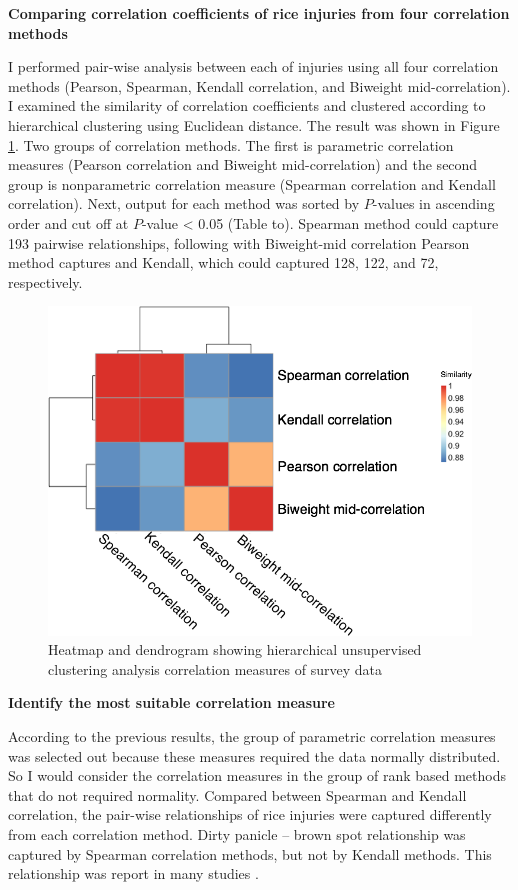 \textbf{Comparing correlation coefficients of rice injuries from four correlation methods }

I performed pair-wise analysis between each of injuries using all four correlation methods (Pearson, Spearman, Kendall correlation, and Biweight mid-correlation). I examined the similarity of correlation coefficients and clustered according to hierarchical clustering using Euclidean distance. The result was shown in Figure \ref{fig:heatmap}. Two groups of correlation methods. The first is parametric correlation measures (Pearson correlation and Biweight mid-correlation) and the second group is nonparametric correlation measure (Spearman correlation and Kendall correlation). Next, output for each method was sorted by $P$-values in ascending order and cut off at $P$-value < 0.05 (Table to).  Spearman method could capture 193 pairwise relationships, following with Biweight-mid correlation Pearson method captures and Kendall, which could captured 128, 122, and 72, respectively.

\begin{figure}[!h]
\centering
\includegraphics[width = 1\textwidth]{figures/heatmap/heatmap.png}
\caption{Heatmap and dendrogram showing hierarchical unsupervised clustering analysis correlation measures of survey data}
\label{fig:heatmap}
\end{figure}

\textbf{Identify the most suitable correlation measure}

According to the previous results, the group of parametric correlation measures was selected out because these measures required the data normally distributed. So I would consider the correlation measures in the group of rank based methods that do not required normality. Compared between Spearman and Kendall correlation, the pair-wise relationships of rice injuries were captured differently from each correlation method. Dirty panicle – brown spot relationship was captured by Spearman correlation methods, but not by Kendall methods. This relationship was report in many studies \citep{Ou_1985_Rice,Barnwal_2013_Review}.

